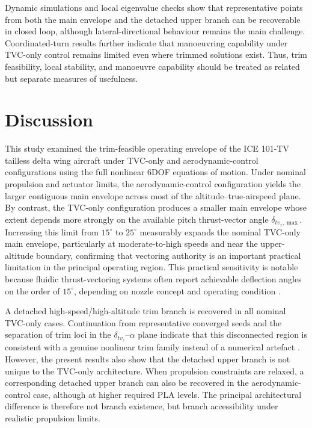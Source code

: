 \documentclass[conf]{new-aiaa}
\begin{document}
Dynamic simulations and local eigenvalue checks show that representative points from both the main envelope and the detached upper branch can be recoverable in closed loop, although lateral-directional behaviour remains the main challenge. Coordinated-turn results further indicate that manoeuvring capability under TVC-only control remains limited even where trimmed solutions exist. Thus, trim feasibility, local stability, and manoeuvre capability should be treated as related but separate measures of usefulness.

\section{Discussion}\label{sec:discussion}
This study examined the trim-feasible operating envelope of the ICE 101-TV tailless delta wing aircraft under TVC-only and aerodynamic-control configurations using the full nonlinear 6DOF equations of motion. Under nominal propulsion and actuator limits, the aerodynamic-control configuration yields the larger contiguous main envelope across most of the altitude--true-airspeed plane. By contrast, the TVC-only configuration produces a smaller main envelope whose extent depends more strongly on the available pitch thrust-vector angle $\delta_{tv_z,\max}$. Increasing this limit from $15^\circ$ to $25^\circ$ measurably expands the nominal TVC-only main envelope, particularly at moderate-to-high speeds and near the upper-altitude boundary, confirming that vectoring authority is an important practical limitation in the principal operating region. This practical sensitivity is notable because fluidic thrust-vectoring systems often report achievable deflection angles on the order of $15^\circ$, depending on nozzle concept and operating condition \cite{Afridi2023,Flamm2001,StrykowskiKrothapalli1993}.

A detached high-speed/high-altitude trim branch is recovered in all nominal TVC-only cases. Continuation from representative converged seeds and the separation of trim loci in the $\delta_{tv_z}$--$\alpha$ plane indicate that this disconnected region is consistent with a genuine nonlinear trim family instead of a numerical artefact \cite{ParanjapeSinhaAnanthkrishnan2007,SharmaEtAl2015,DeMarcoDukeBerndt2007}. However, the present results also show that the detached upper branch is not unique to the TVC-only architecture. When propulsion constraints are relaxed, a corresponding detached upper branch can also be recovered in the aerodynamic-control case, although at higher required PLA levels. The principal architectural difference is therefore not branch existence, but branch accessibility under realistic propulsion limits.
\end{document}
